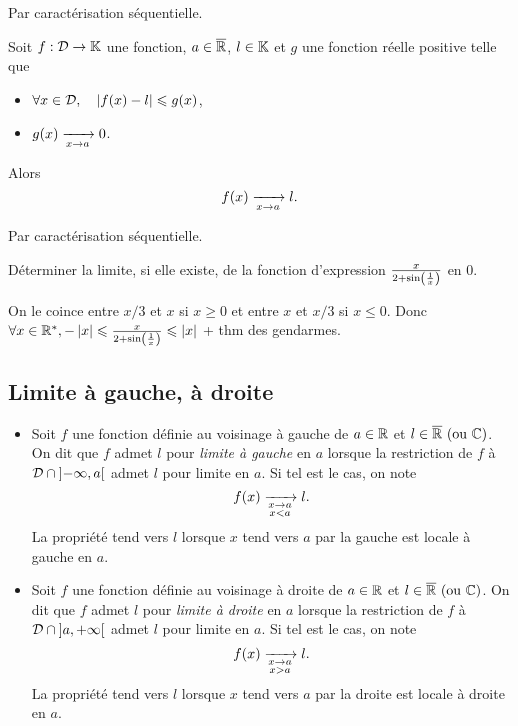 \documentclass{magnolia}
\begin{document}
\begin{preuve}
Par caractérisation séquentielle.
\end{preuve}

\begin{proposition}[utile=-3]
Soit $f:\mathcal{D}\to\mathbb{K}$ une fonction, $a\in\overline{\mathbb{R}}$, $l\in\mathbb{K}$ et $g$ une
fonction réelle positive telle que
\begin{itemize}
\item $\forall x\in\mathcal{D} ,\quad \left|f(x)-l\right|\leqslant g(x)$,
\item $g(x)\xrightarrow[x\rightarrow a]{} 0$.
\end{itemize}
Alors
\[f(x)\xrightarrow[x\rightarrow a]{} l.\]
\end{proposition}

\begin{preuve}
Par caractérisation séquentielle.
\end{preuve}

\begin{exoUnique}
\exo Déterminer la limite, si elle existe, de la fonction d'expression
  $\frac{x}{2+\sin\left(\frac{1}{x}\right)}$ en 0.
\begin{sol}
On le coince entre $x/3$ et $x$ si $x\geq 0$ et entre $x$ et $x/3$ si $x\leq 0$. Donc $\forall x \in {\mathbb{R}^*}, -\left|x\right|\leqslant \frac{x}{2+\sin\left(\frac{1}{x}\right)} \leqslant \left|x\right|$ + thm des gendarmes.
\end{sol}
\end{exoUnique}

\subsection{Limite à gauche, à droite}

\begin{definition}[utile=-3]

\begin{itemize}
\item Soit $f$ une fonction définie au voisinage à gauche de $a\in\mathbb{R}$ et
  $l\in\text{$\overline{\mathbb{R}}$ (ou $\mathbb{C}$)}$. On dit que $f$ admet $l$ pour \emph{limite à gauche} en $a$ lorsque
  la restriction de $f$ à $\mathcal{D}\cap\left]-\infty,a\right[$ admet $l$ pour
  limite en $a$. Si tel est le cas, on note
  \[f(x)\xrightarrow[ \substack{x\rightarrow a \\ x<a}]{} l.\]
  La propriété \og tend vers $l$ lorsque $x$ tend vers $a$ par la gauche \fg est
  locale à gauche en $a$.
\item Soit $f$ une fonction définie au voisinage à droite de $a\in\mathbb{R}$ et
  $l\in\text{$\overline{\mathbb{R}}$ (ou $\mathbb{C}$)}$. On dit que $f$ admet $l$ pour \emph{limite à droite} en $a$ lorsque
  la restriction de $f$ à $\mathcal{D}\cap\left]a,+\infty\right[$ admet $l$ pour
  limite en $a$. Si tel est le cas, on note
  \[f(x)\xrightarrow[ \substack{x\rightarrow a \\ x>a}]{} l.\]
  La propriété \og tend vers $l$ lorsque $x$ tend vers $a$ par la droite \fg est
  locale à droite en $a$.
\end{itemize}
\end{definition}
\end{document}
